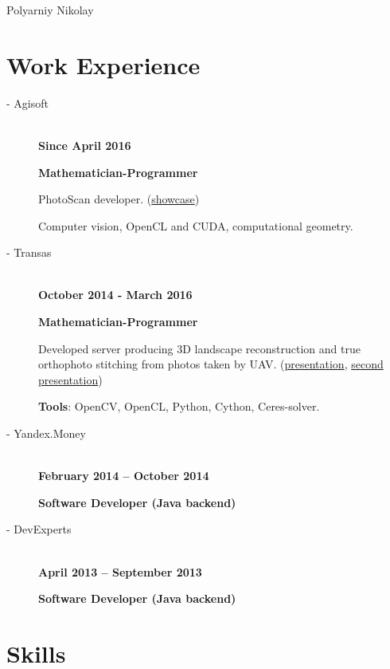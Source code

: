 \documentclass[11pt,oneside]{article}
\newcommand{\hhref}[2]{\href{#1}{\color{blue}#2}}
\begin{document}
\begin{center}
	{\huge Polyarniy Nikolay}
\end{center}


\vspace{-9pt}
\section*{\textbf{Work Experience}}
\vspace{-9pt}

\begin{description}
  \item[ - Agisoft] \hfill \\
    \textbf{Since April 2016}
  
    \textbf{Mathematician-Programmer}
    
    PhotoScan developer. (\hhref{http://www.agisoft.com/community/showcase/}{showcase})
    
    Computer vision, OpenCL and CUDA, computational geometry.
  \item[ - Transas] \hfill \\
    \textbf{October 2014 - March 2016}
  
    \textbf{Mathematician-Programmer}
    
    Developed server producing 3D landscape reconstruction and true orthophoto stitching from photos taken by UAV. (\hhref{http://polarnick239.github.io/old/cv/Monoceros1.pdf}{presentation}, \hhref{http://polarnick239.github.io/old/cv/Monoceros2.pdf}{second presentation})
    
    \textbf{Tools}: OpenCV, OpenCL, Python, Cython, Ceres-solver.
  \item[ - Yandex.Money] \hfill \\
    \textbf{February 2014 – October 2014}
    
    \textbf{Software Developer (Java backend)}
  \item[ - DevExperts] \hfill \\
    \textbf{April 2013 – September 2013}
    
    \textbf{Software Developer (Java backend)}
    
\end{description}


\vspace{-9pt}
\section*{\textbf{Skills}}
\vspace{-9pt}
\end{document}
